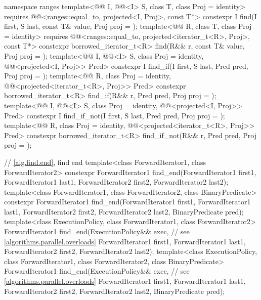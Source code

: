 \begin{codeblock}
{  namespace ranges {
    template<@@ I, @@<I> S, class T, class Proj = identity>
      requires @@<ranges::equal_to, projected<I, Proj>, const T*>
      constexpr I find(I first, S last, const T& value, Proj proj = {});
    template<@@ R, class T, class Proj = identity>
      requires @@<ranges::equal_to,
                                         projected<iterator_t<R>, Proj>, const T*>
      constexpr borrowed_iterator_t<R>
        find(R&& r, const T& value, Proj proj = {});
    template<@@ I, @@<I> S, class Proj = identity,
             @@<projected<I, Proj>> Pred>
      constexpr I find_if(I first, S last, Pred pred, Proj proj = {});
    template<@@ R, class Proj = identity,
             @@<projected<iterator_t<R>, Proj>> Pred>
      constexpr borrowed_iterator_t<R>
        find_if(R&& r, Pred pred, Proj proj = {});
    template<@@ I, @@<I> S, class Proj = identity,
             @@<projected<I, Proj>> Pred>
      constexpr I find_if_not(I first, S last, Pred pred, Proj proj = {});
    template<@@ R, class Proj = identity,
             @@<projected<iterator_t<R>, Proj>> Pred>
      constexpr borrowed_iterator_t<R>
        find_if_not(R&& r, Pred pred, Proj proj = {});
  }

  // \ref{alg.find.end}, find end
  template<class ForwardIterator1, class ForwardIterator2>
    constexpr ForwardIterator1
      find_end(ForwardIterator1 first1, ForwardIterator1 last1,
               ForwardIterator2 first2, ForwardIterator2 last2);
  template<class ForwardIterator1, class ForwardIterator2, class BinaryPredicate>
    constexpr ForwardIterator1
      find_end(ForwardIterator1 first1, ForwardIterator1 last1,
               ForwardIterator2 first2, ForwardIterator2 last2,
               BinaryPredicate pred);
  template<class ExecutionPolicy, class ForwardIterator1, class ForwardIterator2>
    ForwardIterator1
      find_end(ExecutionPolicy&& exec,                          // see \ref{algorithms.parallel.overloads}
               ForwardIterator1 first1, ForwardIterator1 last1,
               ForwardIterator2 first2, ForwardIterator2 last2);
  template<class ExecutionPolicy, class ForwardIterator1,
           class ForwardIterator2, class BinaryPredicate>
    ForwardIterator1
      find_end(ExecutionPolicy&& exec,                          // see \ref{algorithms.parallel.overloads}
               ForwardIterator1 first1, ForwardIterator1 last1,
               ForwardIterator2 first2, ForwardIterator2 last2,
               BinaryPredicate pred);

}
\end{codeblock}
